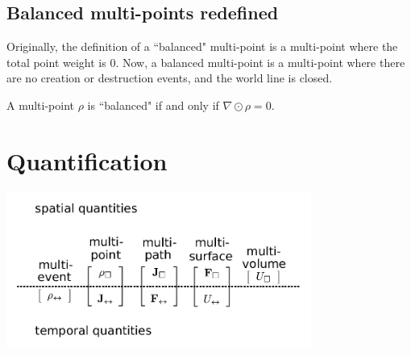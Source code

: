 \subsection{Balanced multi-points redefined}


Originally, the definition of a ``balanced" multi-point is a multi-point where the total point weight is \(0\). Now, a balanced multi-point is a multi-point where there are no creation or destruction events, and the world line is closed. 

A multi-point \(\rho\) is ``balanced" if and only if \(\nabla \odot \rho = 0\). 





\section{Quantification}

\includegraphics[width = 0.75\textwidth]{Time/quantifying_multi-structures_with_time}

